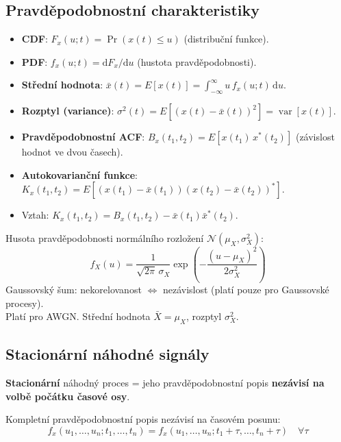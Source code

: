 \documentclass[12pt,a4paper]{article}
\newcommand{\dd}{\mathrm{d}}
\begin{document}
\subsection*{Pravděpodobnostní charakteristiky}

\begin{itemize}
  \item \textbf{CDF}: $F_x(u;t) = \Pr(x(t) \leq u)$ (distribuční funkce).
  \item \textbf{PDF}: $f_x(u;t) = \dd F_x/\dd u$ (hustota pravděpodobnosti).
  \item \textbf{Střední hodnota}: $\bar{x}(t) = E[x(t)] = \int_{-\infty}^{\infty} u\,f_x(u;t)\,\dd u$.
  \item \textbf{Rozptyl (variance)}: $\sigma^2(t) = E[(x(t)-\bar{x}(t))^2] = \operatorname{var}[x(t)]$.
  \item \textbf{Pravděpodobnostní ACF}: $B_x(t_1,t_2) = E[x(t_1)\,x^*(t_2)]$ (závislost hodnot ve dvou časech).
  \item \textbf{Autokovarianční funkce}: $K_x(t_1,t_2) = E[(x(t_1)-\bar{x}(t_1))(x(t_2)-\bar{x}(t_2))^*]$.
  \item Vztah: $K_x(t_1,t_2) = B_x(t_1,t_2) - \bar{x}(t_1)\bar{x}^*(t_2)$.
\end{itemize}

\begin{noteBox}
Husota pravděpodobnosti normálního rozložení $\mathcal{N}(\mu_X, \sigma_X^2)$:
\[
  f_X(u) = \frac{1}{\sqrt{2\pi}\,\sigma_X}\exp\!\left(-\frac{(u-\mu_X)^2}{2\sigma_X^2}\right)
\]
Gaussovský šum: nekorelovanost $\Leftrightarrow$ nezávislost (platí pouze pro Gaussovské procesy).\\
Platí pro AWGN. Střední hodnota $\bar{X} = \mu_X$, rozptyl $\sigma_X^2$.
\end{noteBox}

\begin{hvezdBox}
\subsection*{Stacionární náhodné signály}
\end{hvezdBox}

\textbf{Stacionární} náhodný proces = jeho pravděpodobnostní popis \textbf{nezávisí na volbě počátku časové osy}.

\begin{infoBox}
Kompletní pravděpodobnostní popis nezávisí na časovém posunu:
\[
  f_x(u_1, \ldots, u_n; t_1, \ldots, t_n) = f_x(u_1, \ldots, u_n; t_1+\tau, \ldots, t_n+\tau)
  \quad \forall\tau
\]
\end{infoBox}
\end{document}
